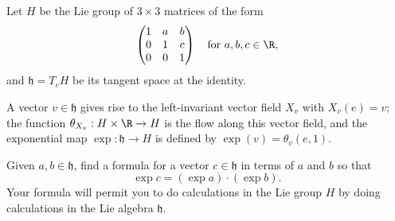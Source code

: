 \documentclass[12pt]{pset}
\newcommand{\HH}{H}
\newcommand{\hh}{\mathfrak{h}}
\begin{document}
\begin{problem}

  Let $\HH$ be the Lie group of $3 \times 3$ matrices of the form
  $$
  \begin{pmatrix}
    1 & a & b \\
    0 & 1 & c \\
    0 & 0 & 1
  \end{pmatrix}\hspace{1em}\mbox{for $a, b, c \in \R$,}
  $$
  and $\hh = T_e \HH$ be its tangent space at the identity.

  \vspace{1ex}\noindent%
  A vector $v \in \hh$ gives rise to the left-invariant vector
  field $X_v$ with $X_v(e) = v$; the function $\theta_{X_v} : \HH \times \R
  \to \HH$ is the flow along this vector field, and the exponential
  map $\exp : \hh \to \HH$ is defined by $\exp(v) =
  \theta_v(e,1)$.

  \vspace{1ex}\noindent%
  Given $a, b \in \hh$, find a formula for a vector $c \in \hh$
  in terms of $a$ and $b$ so that $$\exp c = (\exp a) \cdot (\exp b).$$
  Your formula will permit you to do calculations in the Lie group
  $\HH$ by doing calculations in the Lie algebra $\hh$.
  
\end{problem}

\vfill
\vfill
\end{document}
